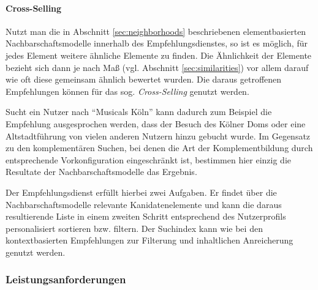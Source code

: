 
\paragraph{Cross-Selling} Nutzt man die in Abschnitt \ref{sec:neighborhoods} beschriebenen elementbasierten Nachbarschaftsmodelle innerhalb des Empfehlungsdienstes, so ist es möglich, für jedes Element weitere ähnliche Elemente zu finden. Die Ähnlichkeit der Elemente bezieht sich dann je nach Maß (vgl. Abschnitt \ref{sec:similarities}) vor allem darauf wie oft diese gemeinsam ähnlich bewertet wurden. Die daraus getroffenen Empfehlungen können für das sog. \textit{Cross-Selling} genutzt werden.

Sucht ein Nutzer nach ``Musicals Köln'' kann dadurch zum Beispiel die Empfehlung ausgesprochen werden, dass der Besuch des Kölner Doms oder eine Altstadtführung von vielen anderen Nutzern hinzu gebucht wurde. Im Gegensatz zu den komplementären Suchen, bei denen die Art der Komplementbildung durch entsprechende Vorkonfiguration eingeschränkt ist, bestimmen hier einzig die Resultate der Nachbarschaftsmodelle das Ergebnis.

Der Empfehlungsdienst erfüllt hierbei zwei Aufgaben. Er findet über die Nachbarschaftsmodelle relevante Kanidatenelemente und kann die daraus resultierende Liste in einem zweiten Schritt entsprechend des Nutzerprofils personalisiert sortieren bzw. filtern. Der Suchindex kann wie bei den kontextbasierten Empfehlungen zur Filterung und inhaltlichen Anreicherung genutzt werden.

\subsubsection{Leistungsanforderungen}\label{sec:performancereq}

